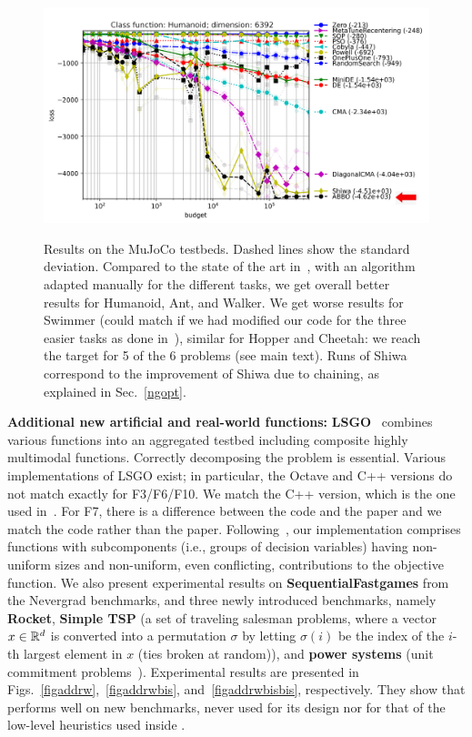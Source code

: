 \begin{figure}[t]
    \includegraphics[width=.48\textwidth]{sections/appendix/h220benchmarks/benchmark/control_problem/xpresults_dimension6392,function_classHumanoid,parametrizationsigma=0.001_edited.png}\\
	\caption{Results on the MuJoCo testbeds. Dashed lines show the standard deviation. Compared to the state of the art in~\cite{lamcts}, with an algorithm adapted manually for the different tasks, we get overall better results for Humanoid, Ant, and Walker. We get worse results for Swimmer (could match if we had modified our code for the three easier tasks as done in~\cite{lamcts}), similar for Hopper and Cheetah: we reach the target for 5 of the 6 problems (see main text). Runs of Shiwa correspond to the improvement of Shiwa due to chaining, as explained in Sec.~\ref{ngopt}.}
    \label{figMuJoCobis}
\end{figure}

{\textbf{Additional new artificial and real-world functions:}}\label{b6}
\textbf{LSGO}~\cite{lsgo} combines various functions into an aggregated testbed including composite highly multimodal functions. Correctly decomposing the problem is essential.
Various implementations of LSGO exist; in particular, {the Octave and C++ versions do not match exactly for F3/F6/F10. We match the C++ version, which is the one used in~\cite{lsgo}. For F7, there is a difference between the code and the paper and we match the code rather than the paper.} 
Following~\cite{lsgo}, our implementation comprises functions with subcomponents (i.e., groups of decision variables) having non-uniform sizes and non-uniform, even conflicting, contributions to the objective function. 
We also present experimental results on \textbf{SequentialFastgames} from the Nevergrad benchmarks, and three newly introduced benchmarks, namely \textbf{Rocket}, \textbf{Simple TSP} (a set of traveling salesman problems, {where a vector $x\in \mathbb{R}^d$ is converted into a permutation $\sigma$ by letting $\sigma(i)$ be the index of the $i$-th largest element in $x$ (ties broken at random)}), and \textbf{power systems} (unit commitment problems~\cite{unitcommitment}). Experimental results are presented in Figs.~\ref{figaddrw},~\ref{figaddrwbis}, and~\ref{figaddrwbisbis}, respectively. They show that \ngoptq{} performs well on new benchmarks, never used for its design nor for that of the low-level heuristics used inside \ngoptq{}. 

